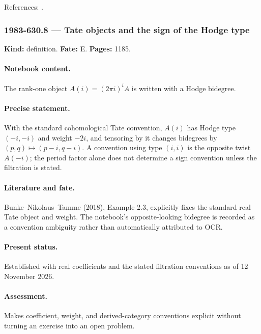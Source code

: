\noindent References: \citep{deligne1971hodge}.\par

\subsubsection{1983-630.8 --- Tate objects and the sign of the Hodge type}

\label{item:1983-630.8}

\noindent\textbf{Kind:} definition. \textbf{Fate:} E. \textbf{Pages:} 1185.\par

\paragraph{Notebook content.} The rank-one object \(A(i)=(2\pi i)^iA\) is written with a Hodge bidegree.

\paragraph{Precise statement.} With the standard cohomological Tate convention, \(A(i)\) has Hodge type \((-i,-i)\) and weight \(-2i\), and tensoring by it changes bidegrees by \((p,q)\mapsto(p-i,q-i)\). A convention using type \((i,i)\) is the opposite twist \(A(-i)\); the period factor alone does not determine a sign convention unless the filtration is stated.

\paragraph{Literature and fate.} Bunke–Nikolaus–Tamme (2018), Example 2.3, explicitly fixes the standard real Tate object and weight. The notebook’s opposite-looking bidegree is recorded as a convention ambiguity rather than automatically attributed to OCR.

\paragraph{Present status.} Established with real coefficients and the stated filtration conventions as of 12 November 2026.

\paragraph{Assessment.} Makes coefficient, weight, and derived-category conventions explicit without turning an exercise into an open problem.

